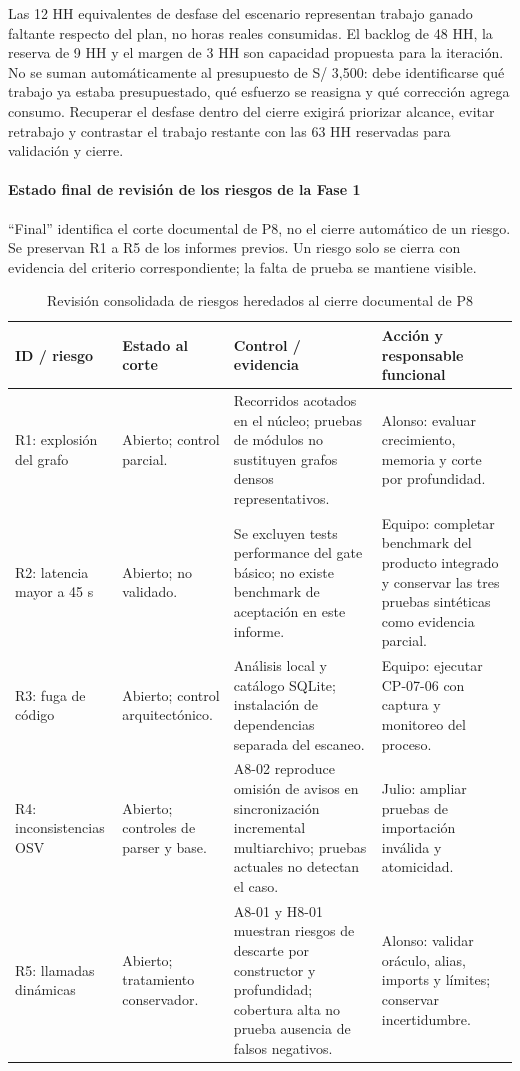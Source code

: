 Las 12 HH equivalentes de desfase del escenario representan trabajo ganado faltante respecto del plan, no horas reales consumidas. El backlog de 48 HH, la reserva de 9 HH y el margen de 3 HH son capacidad propuesta para la iteración. No se suman automáticamente al presupuesto de S/ 3,500: debe identificarse qué trabajo ya estaba presupuestado, qué esfuerzo se reasigna y qué corrección agrega consumo. Recuperar el desfase dentro del cierre exigirá priorizar alcance, evitar retrabajo y contrastar el trabajo restante con las 63 HH reservadas para validación y cierre.

\paragraph*{Estado final de revisión de los riesgos de la Fase 1}
``Final'' identifica el corte documental de P8, no el cierre automático de un riesgo. Se preservan R1 a R5 de los informes previos. Un riesgo solo se cierra con evidencia del criterio correspondiente; la falta de prueba se mantiene visible.

\begin{table}[H]
\centering\small{}
\caption{Revisión consolidada de riesgos heredados al cierre documental de P8}
\begin{tabularx}{\textwidth}{P{2.5cm}P{2.4cm}YY}
\toprule
\textbf{ID / riesgo} & \textbf{Estado al corte} & \textbf{Control / evidencia} & \textbf{Acción y responsable funcional} \\
\midrule
R1: explosión del grafo & Abierto; control parcial. & Recorridos acotados en el núcleo; pruebas de módulos no sustituyen grafos densos representativos. & Alonso: evaluar crecimiento, memoria y corte por profundidad. \\
\addlinespace
R2: latencia mayor a 45 s & Abierto; no validado. & Se excluyen tests performance del gate básico; no existe benchmark de aceptación en este informe. & Equipo: completar benchmark del producto integrado y conservar las tres pruebas sintéticas como evidencia parcial. \\
\addlinespace
R3: fuga de código & Abierto; control arquitectónico. & Análisis local y catálogo SQLite; instalación de dependencias separada del escaneo. & Equipo: ejecutar CP-07-06 con captura y monitoreo del proceso. \\
\addlinespace
R4: inconsistencias OSV & Abierto; controles de parser y base. & A8-02 reproduce omisión de avisos en sincronización incremental multiarchivo; pruebas actuales no detectan el caso. & Julio: ampliar pruebas de importación inválida y atomicidad. \\
\addlinespace
R5: llamadas dinámicas & Abierto; tratamiento conservador. & A8-01 y H8-01 muestran riesgos de descarte por constructor y profundidad; cobertura alta no prueba ausencia de falsos negativos. & Alonso: validar oráculo, alias, imports y límites; conservar incertidumbre. \\
\bottomrule
\end{tabularx}
\end{table}

